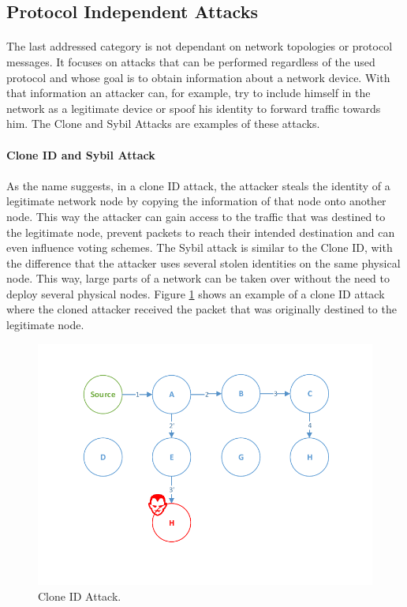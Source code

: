 \subsection{Protocol Independent Attacks}
\paragraph{}
The last addressed category is not dependant on network topologies or protocol messages. It focuses on attacks that can be performed regardless of the used protocol and whose goal is to obtain information about a network device. With that information an attacker can, for example, try to include himself in the network as a legitimate device or spoof his identity to forward traffic towards him. The Clone and Sybil Attacks are examples of these attacks.

\paragraph{\textbf{Clone ID and Sybil Attack}}
\paragraph{}
As the name suggests, in a clone ID attack, the attacker steals the identity of a legitimate network node by copying the information of that node onto another node. This way the attacker can gain access to the traffic that was destined to the legitimate node, prevent packets to reach their intended destination and can even influence voting schemes. The Sybil attack is similar to the Clone ID, with the difference that the attacker uses several stolen identities on the same physical node. This way, large parts of a network can be taken over without the need to deploy several physical nodes. Figure \ref{fig:clone_attack} shows an example of a clone ID attack where the cloned attacker received the packet that was originally destined to the legitimate node.

\begin{figure}[h]
  \centering
  \includegraphics[width=0.85\linewidth]{figures/Clone_attack.pdf}
  \caption{Clone ID Attack.}
  \label{fig:clone_attack}
\end{figure} 

